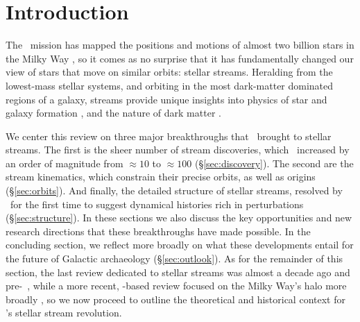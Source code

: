 \documentclass[final,5p,times,twocolumn,authoryear]{elsarticle}
\begin{document}
\begin{frontmatter}
\begin{keyword}



\end{keyword}

\end{frontmatter}


\section{Introduction}
\label{sec:intro}

The \gaia\ mission has mapped the positions and motions of almost two billion stars in the Milky Way \citep{gaiamission:2016, gaiadr1, gaiadr2, gaiaedr3, gaiadr3}, so it comes as no surprise that it has fundamentally changed our view of stars that move on similar orbits: stellar streams.
Heralding from the lowest-mass stellar systems, and orbiting in the most dark-matter dominated regions of a galaxy, streams provide unique insights into physics of star and galaxy formation \citep{smith:2016, ferguson:2016, carlin:2016}, and the nature of dark matter \citep{johnston:2016a, johnston:2016b}.


We center this review on three major breakthroughs that \gaia\ brought to stellar streams.
The first is the sheer number of stream discoveries, which \gaia\ increased by an order of magnitude from $\approx10$ to $\approx100$ (\S\ref{sec:discovery}).
The second are the stream kinematics, which constrain their precise orbits, as well as
origins (\S\ref{sec:orbits}).
And finally, the detailed structure of stellar streams, resolved by \gaia\ for the first
time to suggest dynamical histories rich in perturbations (\S\ref{sec:structure}).
In these sections we also discuss the key opportunities and new research directions that these breakthroughs have made possible.
In the concluding section, we reflect more broadly on what these developments entail for the future of Galactic archaeology (\S\ref{sec:outlook}).
As for the remainder of this section, the last review dedicated to stellar streams was almost a decade ago and pre-\gaia\ \citep{newberg:2016}, while a more recent, \gaia-based review focused on the Milky Way's halo more broadly \citep{helmi:2020}, so we now proceed to outline the theoretical and historical context for \gaia's stellar stream revolution.
\end{document}
